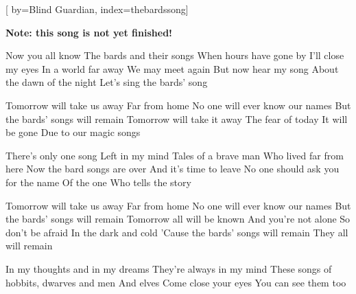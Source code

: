 

[%
    by={Blind Guardian},
    index={thebardssong}]


    \label{thebardssong}

    \textbf{Note: this song is not yet finished!}

    \beginverse
        Now you all know
        The bards and their songs
        When hours have gone by
        I'll close my eyes
        In a world far away
        We may meet again
        But now hear my song
        About the dawn of the night
        Let's sing the bards' song
    \endverse

    \beginchorus
        Tomorrow will take us away
        Far from home
        No one will ever know our names
        But the bards' songs will remain
        Tomorrow will take it away
        The fear of today
        It will be gone
        Due to our magic songs
    \endchorus

    \beginverse
        There's only one song
        Left in my mind
        Tales of a brave man
        Who lived far from here
        Now the bard songs are over
        And it's time to leave
        No one should ask you for the name
        Of the one
        Who tells the story
    \endverse

    \beginchorus
        Tomorrow will take us away
        Far from home
        No one will ever know our names
        But the bards' songs will remain
        Tomorrow all will be known
        And you're not alone
        So don't be afraid
        In the dark and cold
        'Cause the bards' songs will remain
        They all will remain
    \endchorus

    \beginverse*
        In my thoughts and in my dreams
        They're always in my mind
        These songs of hobbits, dwarves and men
        And elves
        Come close your eyes
        You can see them too
    \endverse
\endsong
